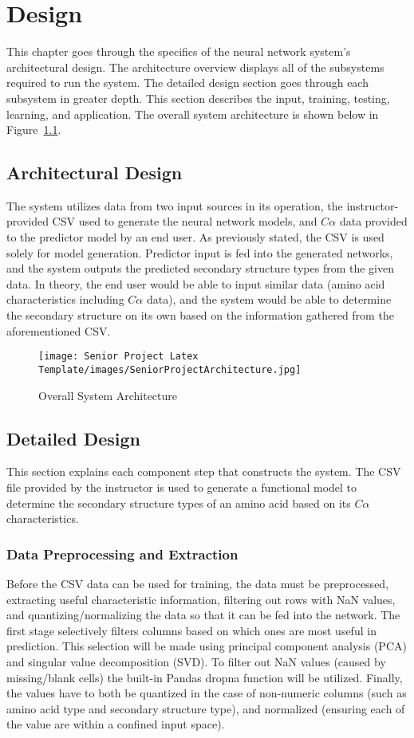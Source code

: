 \documentclass[12pt,letterpaper,oneside,reqno]{book}
\theoremstyle{plain}
\theoremstyle{definition}
\theoremstyle{plain}
\theoremstyle{remark}
\theoremstyle{plain}
\theoremstyle{definition}
\theoremstyle{plain}
\begin{document}
\chapter{Design}
This chapter goes through the specifics of the neural network system's architectural design. The architecture overview displays all of the subsystems required to run the system. The detailed design section goes through each subsystem in greater depth. This section describes the input, training, testing, learning, and application. The overall system architecture is shown below in Figure~\ref{fig:projarchitecture}.

\section{Architectural Design}
The system utilizes data from two input sources in its operation, the instructor-provided CSV used to generate the neural network models, and $C\alpha$ data provided to the predictor model by an end user. As previously stated, the CSV is used solely for model generation. Predictor input is fed into the generated networks, and the system outputs the predicted secondary structure types from the given data. In theory, the end user would be able to input similar data (amino acid characteristics including $C\alpha$ data), and the system would be able to determine the secondary structure on its own based on the information gathered from the aforementioned CSV.

\begin{figure}[H]
    \centering
    \texttt{[image: Senior Project Latex Template/images/SeniorProjectArchitecture.jpg]}
    \caption{Overall System Architecture}
    \label{fig:projarchitecture}
\end{figure}

\section{Detailed Design}
This section explains each component step that constructs the system. The CSV file provided by the instructor is used to generate a functional model to determine the secondary structure types of an amino acid based on its $C\alpha$ characteristics. 
\subsection{Data Preprocessing and Extraction}
Before the CSV data can be used for training, the data must be preprocessed, extracting useful characteristic information, filtering out rows with NaN values, and quantizing/normalizing the data so that it can be fed into the network. The first stage selectively filters columns based on which ones are most useful in prediction. This selection will be made using principal component analysis (PCA) and singular value decomposition (SVD). To filter out NaN values (caused by missing/blank cells) the built-in Pandas dropna function will be utilized. Finally, the values have to both be quantized in the case of non-numeric columns (such as amino acid type and secondary structure type), and normalized (ensuring each of the value are within a confined input space).
\end{document}

